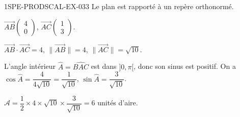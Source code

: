 \begin{corrige}{1SPE-PRODSCAL-EX-033}
Le plan est rapporté à un repère orthonormé.

$\overrightarrow{AB}\begin{pmatrix} 4 \\ 0 \end{pmatrix}$, $\overrightarrow{AC}\begin{pmatrix} 1 \\ 3 \end{pmatrix}$.

$\overrightarrow{AB} \cdot \overrightarrow{AC} = 4$, $\|\overrightarrow{AB}\| = 4$, $\|\overrightarrow{AC}\| = \sqrt{10}$.

L'angle intérieur $\widehat{A}=\widehat{BAC}$ est dans $]0,\pi[$, donc son sinus est positif. On a $\cos\widehat{A} = \dfrac{4}{4\sqrt{10}} = \dfrac{1}{\sqrt{10}}$, $\sin\widehat{A} = \dfrac{3}{\sqrt{10}}$.

$\mathcal{A} = \dfrac{1}{2} \times 4 \times \sqrt{10} \times \dfrac{3}{\sqrt{10}} = 6$ unités d'aire.
\end{corrige}
